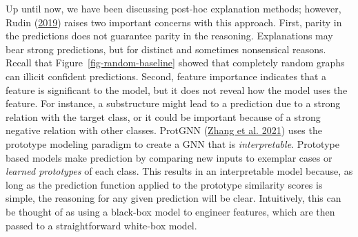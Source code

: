 \documentclass[
  11pt,
  letterpaper,
]{article}
\begin{document}
\quad Up until now, we have been discussing post-hoc explanation
methods; however, Rudin (\protect\hyperlink{ref-Rudin_2019}{2019})
raises two important concerns with this approach. First, parity in the
predictions does not guarantee parity in the reasoning. Explanations may
bear strong predictions, but for distinct and sometimes nonsensical
reasons. Recall that Figure~\ref{fig-random-baseline} showed that
completely random graphs can illicit confident predictions. Second,
feature importance indicates that a feature is significant to the model,
but it does not reveal how the model uses the feature. For instance, a
substructure might lead to a prediction due to a strong relation with
the target class, or it could be important because of a strong negative
relation with other classes. ProtGNN
(\protect\hyperlink{ref-Zhang_Liu_Wang_Lu_Lee_2021}{Zhang et al. 2021})
uses the prototype modeling paradigm to create a GNN that is
\emph{interpretable}. Prototype based models make prediction by
comparing new inputs to exemplar cases or \emph{learned prototypes} of
each class. This results in an interpretable model because, as long as
the prediction function applied to the prototype similarity scores is
simple, the reasoning for any given prediction will be clear.
Intuitively, this can be thought of as using a black-box model to
engineer features, which are then passed to a straightforward white-box
model.
\end{document}
